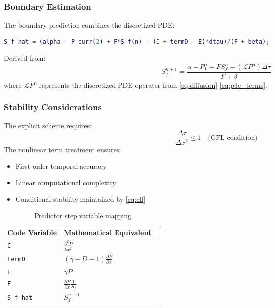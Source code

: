 \documentclass{article}
\begin{document}
\subsubsection{Boundary Estimation}
The boundary prediction combines the discretized PDE:

\begin{lstlisting}[language=Matlab,caption={Boundary predictor},label=code:boundary_pred]
S_f_hat = (alpha - P_curr(2) + F*S_f(n) - (C + termD - E)*dtau)/(F + beta);
\end{lstlisting}

Derived from:
\begin{equation}
S_f^{n+1} = \frac{\alpha - P_1^n + F S_f^n - (\mathcal{L}P^n)\Delta\tau}{F + \beta} \label{eq:boundary_update}
\end{equation}
where \(\mathcal{L}P^n\) represents the discretized PDE operator from \eqref{eq:diffusion}-\eqref{eq:pde_terms}.

\subsubsection{Stability Considerations}
The explicit scheme requires:
\begin{equation}
\frac{\Delta\tau}{\Delta x^2} \leq 1 \quad \text{(CFL condition)} \label{eq:cfl}
\end{equation}
The nonlinear term treatment ensures:
\begin{itemize}
\item First-order temporal accuracy
\item Linear computational complexity
\item Conditional stability maintained by \eqref{eq:cfl}
\end{itemize}

\begin{table}[h]
\centering
\caption{Predictor step variable mapping}
\begin{tabular}{lll}
\hline
Code Variable & Mathematical Equivalent\\ \hline
\texttt{C} & \(\frac{\partial^2 P}{\partial x^2}\) \\
\texttt{termD} & \((\gamma-D-1)\frac{\partial P}{\partial x}\) \\
\texttt{E} & \(\gamma P\) \\
\texttt{F} & \(\frac{\partial P}{\partial x}\frac{1}{S_f}\)\\
\texttt{S\_f\_hat} & \(S_f^{n+1}\)\\ \hline
\end{tabular}
\end{table}
\end{document}
